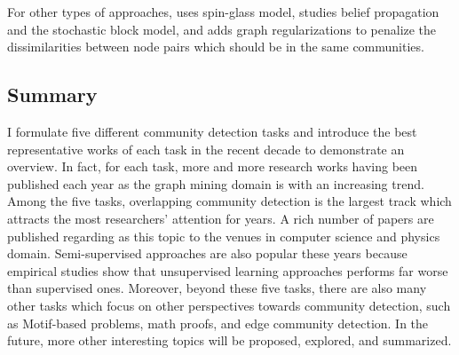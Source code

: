  For other types of approaches, \cite{eaton2012spin} uses spin-glass model,  \cite{zhang2014phase} studies belief propagation and the stochastic block model, and \cite{yang2014unified} adds graph regularizations to penalize the dissimilarities between node pairs which should be in the same communities. 
 
\subsection{Summary}

I  formulate five different community detection tasks and introduce the best representative works of each task in the recent decade to demonstrate an overview. In fact, for each task, more and more research works having been published each year as the graph mining domain is with an increasing trend. Among the five tasks, overlapping community detection is the largest track which attracts the most researchers' attention for years. A rich number of papers are published regarding as this topic to the venues in computer science and physics domain. Semi-supervised approaches are also popular these years because empirical studies show that unsupervised learning approaches performs far worse than supervised ones. Moreover, beyond these five tasks, there are also many other tasks which focus on other perspectives towards community detection, such as Motif-based problems, math proofs, and edge community detection. In the future, more other interesting topics will be proposed, explored, and summarized. 